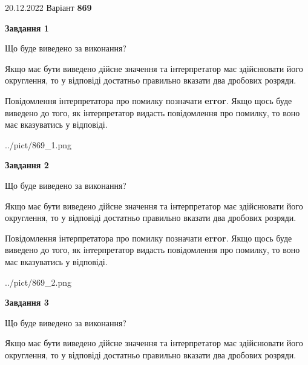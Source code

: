 \documentclass[12pt, ukrainian]{article}
\begin{document}
{20.12.2022 Варіант \No \textbf { 869 }\par}
{
\begin {Large}

{\begin {center}\textbf{Завдання 1}\end {center}}\par
Що буде виведено за виконання? \par

Якщо має бути виведено дійсне значення та інтерпретатор має здійснювати його округлення, 
то у відповіді достатньо правильно вказати два дробових розряди.

Повідомлення інтерпретатора про помилку позначати \textbf{error}.
Якщо щось буде виведено до того, як інтерпретатор видасть повідомлення про помилку, 
то воно має вказуватись у відповіді. \par

\begin{center}
	{../pict/869_1.png}
\end{center}
\newpage

{\begin {center}\textbf{Завдання 2}\end {center}}\par
Що буде виведено за виконання? \par

Якщо має бути виведено дійсне значення та інтерпретатор має здійснювати його округлення, 
то у відповіді достатньо правильно вказати два дробових розряди.

Повідомлення інтерпретатора про помилку позначати \textbf{error}.
Якщо щось буде виведено до того, як інтерпретатор видасть повідомлення про помилку, 
то воно має вказуватись у відповіді. \par

\begin{center}
	{../pict/869_2.png}
\end{center}
\newpage

{\begin {center}\textbf{Завдання 3}\end {center}}\par
Що буде виведено за виконання? \par

Якщо має бути виведено дійсне значення та інтерпретатор має здійснювати його округлення, 
то у відповіді достатньо правильно вказати два дробових розряди.


\end{Large}}
\end{document}
